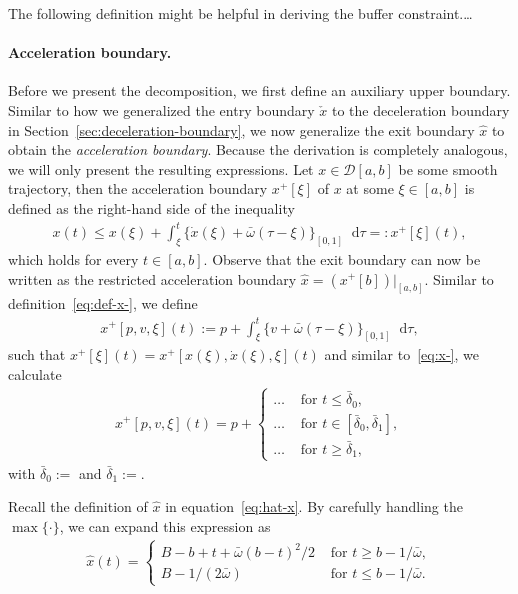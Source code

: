 \documentclass[a4paper]{report}
\theoremstyle{definition}
\theoremstyle{plain}
\newcommand*\diff{\mathop{}\!\mathrm{d}}
\newcommand\note[1]{{\color{Navy}\noindent#1}}
\begin{document}
\note{The following definition might be helpful in deriving the buffer constraint.\dots}

\paragraph{Acceleration boundary.}
Before we present the decomposition, we first define an auxiliary upper
boundary.
%
Similar to how we generalized the entry boundary $\check{x}$ to the deceleration
boundary in Section~\ref{sec:deceleration-boundary}, we now generalize the exit
boundary $\hat{x}$ to obtain the \emph{acceleration boundary}.
%
Because the derivation is completely analogous, we will only present the
resulting expressions.
%
Let $x \in \mathcal{D}[a,b]$ be some smooth trajectory, then the acceleration
boundary $x^{+}[\xi]$ of $x$ at some $\xi \in [a,b]$ is defined as the
right-hand side of the inequality
\begin{align}
  x(t) \leq x(\xi) + \int_{\xi}^{t} \{\dot{x}(\xi) + \bar{\omega} (\tau - \xi) \}_{[0,1]} \diff \tau =: x^{+}[\xi](t) ,
\end{align}
which holds for every $t \in [a,b]$.
%
Observe that the exit boundary can now be written as the restricted acceleration
boundary $\hat{x} = (x^{+}[b])|_{[a,b]}$.
%
Similar to definition~\eqref{eq:def-x-}, we define
\begin{align}
  x^{+}[p,v,\xi](t) := p + \int_{\xi}^{t}\{ v + \bar{\omega}(\tau - \xi)\}_{[0,1]} \diff \tau ,
\end{align}
such that $x^{+}[\xi](t) = x^{+}[x(\xi),\dot{x}(\xi),\xi](t)$ and
%
similar to~\eqref{eq:x-}, we calculate
\begin{align}
  x^{+}[p,v,\xi](t) = p +
  \begin{cases}
    \dots &\text{ for } t \leq \bar{\delta}_{0} , \\
    \dots &\text{ for } t \in [\bar{\delta}_{0}, \bar{\delta}_{1} ] , \\
    \dots &\text{ for } t \geq \bar{\delta}_{1} ,
  \end{cases}
\end{align}
with $\bar{\delta}_{0} := $ and $\bar{\delta}_{1} := $.

\note{
Recall the definition of $\hat{x}$ in equation~\eqref{eq:hat-x}. By carefully
handling the $\max\{\cdot\}$, we can expand this expression as
\begin{align}
  \hat{x}(t) =
  \begin{cases}
    B - b + t + \bar{\omega} (b-t)^{2} / 2 &\text{ for } t \geq b - 1/\bar{\omega} , \\
    B - 1/(2\bar{\omega}) &\text{ for } t \leq b - 1/\bar{\omega} .
  \end{cases}
\end{align}
}
\end{document}
